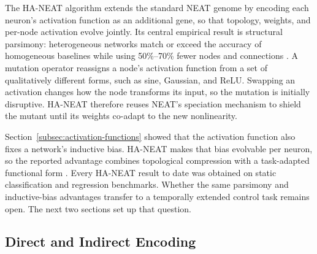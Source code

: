 \documentclass[12pt]{article}
\newcommand{\revTerm}[2]{#2}
\begin{document}
The HA-NEAT algorithm \parencite{hagg_evolving_2017} extends the standard NEAT genome by encoding each neuron's activation function as an additional gene, so that topology, weights, and per-node activation evolve jointly.
Its central empirical result is structural parsimony: heterogeneous networks match or exceed the accuracy of homogeneous baselines while using 50\%--70\% fewer nodes and connections \parencite{hagg_evolving_2017}.
A mutation operator reassigns a node's activation function \revTerm{T-04}{from a set of qualitatively different forms}, such as sine, Gaussian, and ReLU.
Swapping an activation changes how the node transforms its input, so the mutation is initially disruptive.
HA-NEAT therefore reuses NEAT's speciation mechanism to shield the mutant until its weights co-adapt to the new nonlinearity.

Section~\ref{subsec:activation-functions} showed that the activation function also fixes a network's inductive bias.
HA-NEAT makes that bias evolvable per neuron, so the reported advantage combines topological compression with a task-adapted functional form \parencite{papavasileiou_optimizing_2022}.
Every HA-NEAT result to date was obtained on static classification and regression benchmarks.
Whether the same parsimony and inductive-bias advantages transfer to a temporally extended control task remains open. The next two sections set up that question.


\subsection{Direct and Indirect Encoding}
\label{subsec:direct-and-indirect-encoding}
\end{document}
